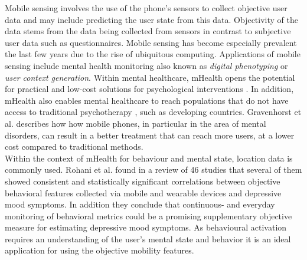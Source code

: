 Mobile sensing involves the use of the phone's sensors to collect objective user data and may include predicting the user state from this data. Objectivity of the data stems from the data being collected from sensors in contrast to subjective user data such as questionnaires. Mobile sensing has become especially prevalent the last few years due to the rise of ubiquitous computing. Applications of mobile sensing include mental health monitoring also known as \textit{digital phenotyping} or \textit{user context generation}. Within mental healthcare, mHealth opens the potential for practical and low-cost solutions for psychological interventions \cite{mobile-based-interventions}. In addition, mHealth also enables mental healthcare to reach populations that do not have access to traditional psychotherapy \cite{future-mental-health}, such as developing countries. Gravenhorst et al. \cite{Gravenhorst2015} describes how how mobile phones, in particular in the area of mental disorders, can result in a better treatment that can reach more users, at a lower cost compared to traditional methods.\\ 

Within the context of mHealth for behaviour and mental state, location data is commonly used. Rohani et al. \cite{rohani2018-correlations} found in a review of 46 studies that several of them showed consistent and statistically significant correlations between objective behavioral features collected via mobile and wearable devices and depressive mood symptoms. In addition they conclude that continuous- and everyday monitoring of behavioral metrics could be a promising supplementary objective measure for estimating depressive mood symptoms. As behavioural activation requires an understanding of the user's mental state and behavior it is an ideal application for using the objective mobility features. \\


